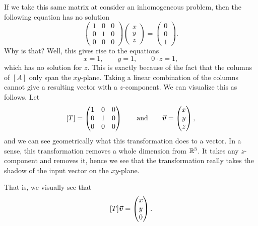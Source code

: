         If we take this same matrix at consider an inhomogeneous problem, then the following equation has no solution
        \[
        \begin{pmatrix} 1 & 0 & 0 \\ 0 & 1 & 0 \\ 0 & 0 & 0 \end{pmatrix} \begin{pmatrix} x \\ y \\ z \end{pmatrix} = \begin{pmatrix} 0 \\ 0 \\ 1 \end{pmatrix}.        
        \]
        Why is that? Well, this gives rise to the equations
        \[
        x=1,\qquad y=1, \qquad 0\cdot z = 1,
        \]
        which has no solution for $z$.  This is exactly because of the fact that the columns of $[A]$ only span the $xy$-plane.  Taking a linear combination of the columns cannot give a resulting vector with a $z$-component.  We can visualize this as follows.  Let
        \[
        [T]=\begin{pmatrix} 1 & 0 & 0 \\ 0 & 1 & 0 \\ 0 & 0 & 0 \end{pmatrix} \qquad \textrm{and} \qquad \boldsymbol{\boldsymbol{\vec{v}}} = \begin{pmatrix} x \\ y \\ z \end{pmatrix},
        \]
        and we can see geometrically what this transformation does to a vector.  In a sense, this transformation removes a whole dimension from $\mathbb{R}^3$. It takes any $z$-component and removes it, hence we see that the transformation really takes the shadow of the input vector on the $xy$-plane.
        \begin{figure}[H]
            \centering
            \resizebox{.75\textwidth}{!}{}
        \end{figure}
        That is, we visually see that
        \[
        [T]\boldsymbol{\boldsymbol{\vec{v}}} = \begin{pmatrix} x \\ y \\ 0 \end{pmatrix}.
        \]
        
